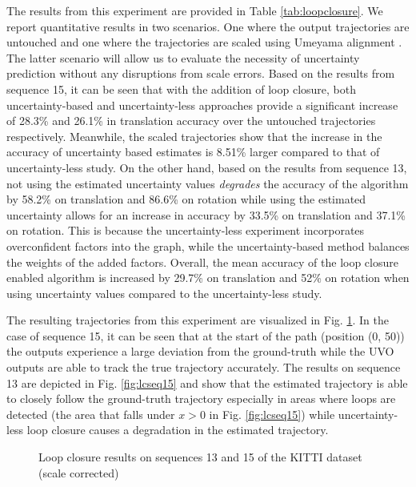 \documentclass[letterpaper, 10 pt]{ieeeconf}  %
\begin{document}
The results from this experiment are provided in Table \ref{tab:loopclosure}. We report quantitative results in two scenarios. One where the output trajectories are untouched and one where the trajectories are scaled using Umeyama alignment \cite{umeyama1991least}. The latter scenario will allow us to evaluate the necessity of uncertainty prediction without any disruptions from scale errors. Based on the results from sequence 15, it can be seen that with the addition of loop closure, both uncertainty-based and uncertainty-less approaches provide a significant increase of 28.3\% and 26.1\% in translation accuracy over the untouched trajectories respectively. Meanwhile, the scaled trajectories show that the increase in the accuracy of uncertainty based estimates is 8.51\% larger compared to that of uncertainty-less study. On the other hand, based on the results from sequence 13, not using the estimated uncertainty values \emph{degrades} the accuracy of the algorithm by 58.2\% on translation and 86.6\% on rotation while using the estimated uncertainty allows for an increase in accuracy by 33.5\% on translation and 37.1\% on rotation. This is because the uncertainty-less experiment incorporates overconfident factors into the graph, while the uncertainty-based method balances the weights of the added factors. Overall, the mean accuracy of the loop closure enabled algorithm is increased by 29.7\% on translation and 52\% on rotation when using uncertainty values compared to the uncertainty-less study.

The resulting trajectories from this experiment are visualized in Fig. \ref{fig:lcqualitative}. In the case of sequence 15, it can be seen that at the start of the path (position (0, 50)) the outputs experience a large deviation from the ground-truth while the UVO outputs are able to track the true trajectory accurately. The results on sequence 13 are depicted in Fig. \ref{fig:lcseq15} and show that the estimated trajectory is able to closely follow the ground-truth trajectory especially in areas where loops are detected (the area that falls under $x>0$ in Fig. \ref{fig:lcseq15}) while uncertainty-less loop closure causes a degradation in the estimated trajectory.

\begin{figure}%
\centering
{}%
\qquad
\hspace{-1.15cm}
%
\caption{Loop closure results on sequences 13 and 15 of the KITTI dataset (scale corrected)}
\label{fig:lcqualitative}
\vspace{-0.3cm}
\end{figure}
\end{document}
